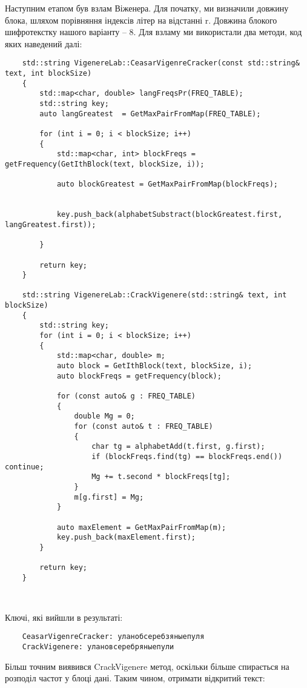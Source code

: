 \documentclass[12pt]{article}
\begin{document}
Наступним етапом був взлам Віженера. Для початку, ми визначили довжину блока, шляхом порівняння
індексів літер на відстанні r. Довжина блокого шифротекстку нашого варіанту -- 8. Для взламу ми використали
два методи, код яких наведений далі:

\begin{verbatim}
    std::string VigenereLab::CeasarVigenreCracker(const std::string& text, int blockSize)
    {
        std::map<char, double> langFreqsPr(FREQ_TABLE);
        std::string key;
        auto langGreatest  = GetMaxPairFromMap(FREQ_TABLE);

        for (int i = 0; i < blockSize; i++)
        {
            std::map<char, int> blockFreqs = getFrequency(GetIthBlock(text, blockSize, i));

            auto blockGreatest = GetMaxPairFromMap(blockFreqs);


            key.push_back(alphabetSubstract(blockGreatest.first, langGreatest.first));

        }

        return key;
    }

    std::string VigenereLab::CrackVigenere(std::string& text, int blockSize)
    {
        std::string key;
        for (int i = 0; i < blockSize; i++)
        {
            std::map<char, double> m;
            auto block = GetIthBlock(text, blockSize, i);
            auto blockFreqs = getFrequency(block);

            for (const auto& g : FREQ_TABLE)
            {
                double Mg = 0;
                for (const auto& t : FREQ_TABLE)
                {
                    char tg = alphabetAdd(t.first, g.first);
                    if (blockFreqs.find(tg) == blockFreqs.end()) continue;
                    Mg += t.second * blockFreqs[tg];
                }
                m[g.first] = Mg;
            }

            auto maxElement = GetMaxPairFromMap(m);
            key.push_back(maxElement.first);
        }

        return key;
    }

    
\end{verbatim}

Ключі, які вийшли в результаті:

\begin{verbatim}
    CeasarVigenreCracker: уланобсеребзяныепуля
    CrackVigenere: улановсеребряныепули
\end{verbatim}

Більш точним виявився CrackVigenere метод, оскільки більше спирається на розподіл частот у блоці дані.
Таким чином, отримати відкритий текст:
\end{document}

